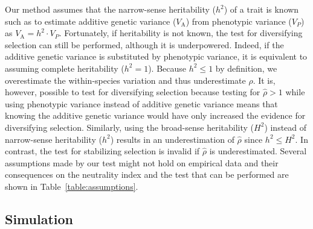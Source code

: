 \documentclass{article}
\newcommand{\Multiply}{\cdot}
\newcommand{\Trait}{P}
\newcommand{\Heritability}{h^2}
\newcommand{\VarPhenotype}{V_{\Trait}}
\newcommand{\VarGenetic}{V_{\mathrm{A}}}
\newcommand{\EstNI}{\widehat{\rho}}
\begin{document}
Our method assumes that the narrow-sense heritability ($\Heritability$) of a trait is known such as to estimate additive genetic variance ($\VarGenetic$) from phenotypic variance ($\VarPhenotype$) as $\VarGenetic = \Heritability \Multiply \VarPhenotype$.
Fortunately, if heritability is not known, the test for diversifying selection can still be performed, although it is underpowered.
Indeed, if the additive genetic variance is substituted by phenotypic variance, it is equivalent to assuming complete heritability ($\Heritability = 1$).
Because $\Heritability \leq 1$ by definition, we overestimate the within-species variation and thus underestimate $\EstNI$.
It is, however, possible to test for diversifying selection because testing for $\EstNI > 1$ while using phenotypic variance instead of additive genetic variance means that knowing the additive genetic variance would have only increased the evidence for diversifying selection.
Similarly, using the broad-sense heritability ($H^2$) instead of narrow-sense heritability ($\Heritability$) results in an underestimation of $\EstNI$ since $\Heritability \leq H^2$.
In contrast, the test for stabilizing selection is invalid if $\EstNI$ is underestimated.
Several assumptions made by our test might not hold on empirical data and their consequences on the neutrality index and the test that can be performed are shown in Table~\ref{table:assumptions}.

\subsection{Simulation}\label{subsec:simulations}
\end{document}
